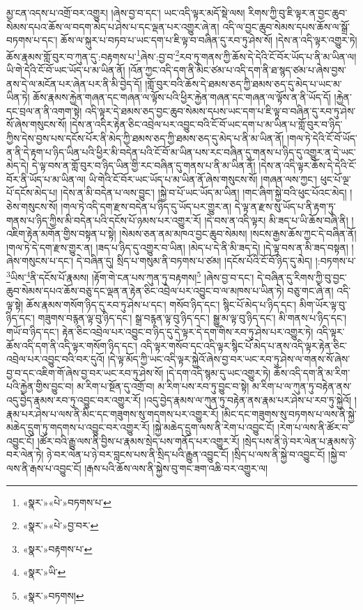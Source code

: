 མྱ་ངན་འདས་པ་འགྲོ་བར་འགྱུར། །ཞེས་བྱ་བ་དང་། ཡང་འདི་ལྟར་མདོ་སྡེ་ལས། རིགས་ཀྱི་བུ་ཇི་ལྟར་ན་བྱང་ཆུབ་སེམས་དཔའ་ཆོས་ལ་བདག་མེད་པ་ཤེས་པ་དང་ལྡན་པར་འགྱུར་ཞེ་ན། འདི་ལ་བྱང་ཆུབ་སེམས་དཔས་ཆོས་ལ་སྒྲོ་བཏགས་པ་དང་། ཆོས་ལ་སྐུར་པ་བཏབ་པ་ཡང་དག་པ་ཇི་ལྟ་བ་བཞིན་དུ་རབ་ཏུ་ཤེས་སོ། །དེས་ན་འདི་ལྟར་འགྱུར་ཏེ། ཆོས་རྣམས་གློ་བུར་བ་ཀུན་དུ་:བརྟགས་པ་\footnote{«སྣར་»«པེ་»བཏགས་པ་}ཞེས་:བྱ་བ་\footnote{«སྣར་»«པེ་»བྱ་བར་}རབ་ཏུ་གནས་ཀྱི་ཆོས་དེ་དེའི་ངོ་བོར་ཡོད་པ་ནི་མ་ཡིན་ལ། ཡི་གེ་དེའི་ངོ་བོ་ཡང་ཡོད་པ་མ་ཡིན་ནོ། །འོན་ཀྱང་འདི་དག་ནི་མིང་ཙམ་པ་འདི་དག་ནི་ཐ་སྙད་ཙམ་པ་ཞེས་བྱས་ནས་དེ་ལ་མངོན་པར་ཞེན་པར་ནི་མི་བྱེད་དོ། །གློ་བུར་བའི་ཆོས་དེ་ཐམས་ཅད་ཀྱི་ཐམས་ཅད་དུ་མེད་པ་ཡང་མ་ཡིན་ཏེ། ཆོས་རྣམས་རྐྱེན་གཞན་དང་གཞན་ལ་ལྟོས་པའི་ཕྱིར་རྐྱེན་གཞན་དང་གཞན་ལ་ལྟོས་ན་ནི་ཡོད་དོ། །རྐྱེན་དང་བྲལ་ན་ནི་འགག་སྟེ། འདི་ལྟར་དེ་ཐམས་ཅད་བྱང་ཆུབ་སེམས་དཔས་ཡང་དག་པ་ཇི་ལྟ་བ་བཞིན་དུ་རབ་ཏུ་ཤེས་སོ་ཞེས་གསུངས་སོ། །དེས་ན་འདིར་རྟེན་ཅིང་འབྲེལ་པར་འབྱུང་བའི་ངོ་བོ་ཡང་དག་པ་མ་ཡིན་པ་གློ་བུར་བ་ཉིད་ཀྱིས་དེས་བྱས་པས་དངོས་པོར་ནི་མེད་ཀྱི་ཐམས་ཅད་ཀྱི་ཐམས་ཅད་དུ་མེད་པ་ནི་མ་ཡིན་ནོ། །གལ་ཏེ་དེའི་ངོ་བོ་ཡོད་ན་ནི་དེ་རྟག་པ་ཉིད་ཡིན་པའི་ཕྱིར་མི་བདེན་པའི་ངོ་བོ་མ་ཡིན་པས་རང་བཞིན་དུ་གནས་པ་ཉིད་དུ་འགྱུར་ན་དེ་ཡང་མེད་དེ། དེ་ལྟ་བས་ན་གློ་བུར་བ་ཉིད་ཡིན་གྱི་རང་བཞིན་དུ་གནས་པ་ནི་མ་ཡིན་ནོ། །དེས་ན་འདི་ལྟར་ཆོས་དེ་དེའི་ངོ་བོར་ནི་ཡོད་པ་མ་ཡིན་ལ། ཡི་གེའི་ངོ་བོར་ཡང་ཡོད་པ་མ་ཡིན་ནོ་ཞེས་གསུངས་སོ། །གཞན་ལས་ཀྱང་། ཕུང་པོ་ལྔ་པོ་དངོས་མེད་པ། །དེས་ན་མི་བདེན་པ་ལས་བྱུང་། །སྐྱེ་བ་པོ་ཡང་ཡོད་མ་ཡིན། །གང་ཞིག་སྐྱེ་བའི་ཕུང་པོའང་མེད། །ཅེས་གསུངས་སོ། །གལ་ཏེ་འདི་དག་རྫས་བདེན་པ་ཉིད་དུ་ཡོད་པར་གྱུར་ན། དེ་ལྟ་ན་རྫས་སུ་ཡོད་པ་ནི་རྟག་ཏུ་གནས་པ་ཉིད་ཀྱིས་མི་བདེན་པའི་དངོས་པོ་ཉམས་པར་འགྱུར་རོ། །དེ་བས་ན་འདི་ལྟར། མི་ཟད་པ་ཡི་ཆོས་བཞི་ནི། །འཇིག་རྟེན་མགོན་གྱིས་བསྟན་པ་སྟེ། །སེམས་ཅན་ནམ་མཁའ་བྱང་ཆུབ་སེམས། །སངས་རྒྱས་ཆོས་ཀྱང་དེ་བཞིན་ནོ། །གལ་ཏེ་དེ་དག་རྫས་གྱུར་ན། །ཟད་པ་ཉིད་དུ་འགྱུར་བ་ཡིན། །མེད་པ་དེ་ནི་མི་ཟད་དེ། །དེ་ལྟ་བས་ན་མི་ཟད་བསྟན། །ཞེས་གསུངས་པ་དང་། དེ་བཞིན་དུ། སྲིད་པ་གསུམ་ནི་བཏགས་པ་ཙམ། །དངོས་པོའི་ངོ་བོ་ཉིད་དུ་མེད། །:བཏགས་པ་\footnote{«སྣར་»བརྟགས་པ་}ཡིས་\footnote{«སྣར་»ཡི་}ནི་དངོས་པོ་རྣམས། །རྟོག་གེ་ངན་པས་ཀུན་ཏུ་བརྟགས།\footnote{«སྣར་»བཏགས།} །ཞེས་བྱ་བ་དང་། དེ་བཞིན་དུ་རིགས་ཀྱི་བུ་བྱང་ཆུབ་སེམས་དཔའ་ཆོས་བཅུ་དང་ལྡན་ན་རྟེན་ཅིང་འབྲེལ་པར་འབྱུང་བ་ལ་མཁས་པ་ཡིན་ཏེ། བཅུ་གང་ཞེ་ན། འདི་ལྟ་སྟེ། ཆོས་རྣམས་གསོག་ཉིད་དུ་རབ་ཏུ་ཤེས་པ་དང་། གསོབ་ཉིད་དང་། སྙིང་པོ་མེད་པ་ཉིད་དང་། མིག་ཡོར་ལྟ་བུ་ཉིད་དང་། གཟུགས་བརྙན་ལྟ་བུ་ཉིད་དང་། སྒྲ་བརྙན་ལྟ་བུ་ཉིད་དང་། སྒྱུ་མ་ལྟ་བུ་ཉིད་དང་། མི་གནས་པ་ཉིད་དང་། གཡོ་བ་ཉིད་དང་། རྟེན་ཅིང་འབྲེལ་པར་འབྱུང་བ་ཉིད་དུ་དེ་ལྟར་དེ་དག་གིས་རབ་ཏུ་ཤེས་པར་འགྱུར་ཏེ། འདི་ལྟར་ཆོས་འདི་དག་ནི་འདི་ལྟར་གསོག་ཉིད་དང་། འདི་ལྟར་གསོབ་དང་འདི་ལྟར་སྙིང་པོ་མེད་པ་ནས་འདི་ལྟར་རྟེན་ཅིང་འབྲེལ་པར་འབྱུང་བའི་བར་དུའོ། །དེ་ལྟ་མོད་ཀྱི་ཡང་འདི་ལྟར་སྐྱེའོ་ཞེས་བྱ་བར་ཡང་རབ་ཏུ་ཤེས་ལ་གནས་སོ་ཞེས་བྱ་བ་དང་འཇིག་གོ་ཞེས་བྱ་བར་ཡང་རབ་ཏུ་ཤེས་སོ། །དེ་དག་འདི་སྙམ་དུ་ཡང་འགྱུར་ཏེ། ཆོས་འདི་དག་ནི་མ་རིག་པའི་རྐྱེན་གྱིས་བྱུང་བ། མ་རིག་པ་སྔོན་དུ་འགྲོ་བ། མ་རིག་པས་རབ་ཏུ་བྱུང་བ་སྟེ། མ་རིག་པ་ལ་ཀུན་ཏུ་བརྟེན་ནས་འདུ་བྱེད་རྣམས་རབ་ཏུ་འབྱུང་བར་འགྱུར་རོ། །འདུ་བྱེད་རྣམས་ལ་ཀུན་ཏུ་བརྟེན་ནས་རྣམ་པར་ཤེས་པ་རབ་ཏུ་སྐྱེའོ། །རྣམ་པར་ཤེས་པ་ལས་ནི་མིང་དང་གཟུགས་སུ་གདགས་པར་འགྱུར་རོ། །མིང་དང་གཟུགས་སུ་བཏགས་པ་ལས་ནི་སྐྱེ་མཆེད་དྲུག་ཏུ་གདགས་པ་འབྱུང་བར་འགྱུར་རོ། །སྐྱེ་མཆེད་དྲུག་ལས་ནི་རེག་པ་འབྱུང་ངོ། །རེག་པ་ལས་ནི་ཚོར་བ་འབྱུང་ངོ། །ཚོར་བའི་རྒྱུ་ལས་ནི་བྱིས་པ་རྣམས་སྲེད་པས་གནོད་པར་འགྱུར་རོ། །སྲེད་པས་ནི་ཉེ་བར་ལེན་པ་རྣམས་ཉེ་བར་ལེན་ཏེ། ཉེ་བར་ལེན་པ་ཉེ་བར་བླངས་པས་ནི་སྲིད་པའི་རྒྱུན་འབྱུང་ངོ། །སྲིད་པ་ལས་ནི་སྐྱེ་བ་འབྱུང་ངོ། །སྐྱེ་བ་ལས་ནི་རྒས་པ་འབྱུང་ངོ། །རྒས་པའི་ཆོས་ལས་ནི་སྐྱེས་བུ་གང་ཟག་འཆི་བར་འགྱུར་ལ། 